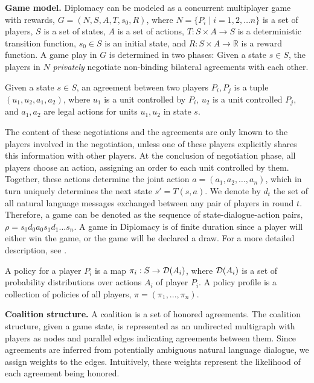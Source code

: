 \textbf{Game model.}  
Diplomacy can be modeled as a concurrent multiplayer game \citep{alur2002alternating} with rewards, $G = (N, S, A, T, s_0, R)$, where $N = \{P_i \mid i = 1, 2, \ldots n\}$ is a set of players, $S$ is a set of states, $A$ is a set of actions, $T: S \times A \rightarrow S$ is a deterministic transition function, $s_0 \in S$ is an initial state, and $R: S \times A \rightarrow \mathbb{R}$ is a reward function. 
A game play in $G$ is determined in two phases: 
Given a state $s \in S$, the players in $N$ \emph{privately} negotiate non-binding bilateral agreements with each other. 
\begin{definition}[Agreement]
	Given a state $s \in S$, an agreement between two players $P_i, P_j$ is a tuple $(u_1, u_2, a_1, a_2)$, where $u_1$ is a unit controlled by $P_i$, $u_2$ is a unit controlled $P_j$, and $a_1, a_2$ are legal actions for units $u_1, u_2$ in state $s$.
\end{definition}

The content of these negotiations and the agreements are only known to the players involved in the negotiation, unless one of these players explicitly shares this information with other players. 
At the conclusion of negotiation phase, all players choose an action, assigning an order to each unit controlled by them. 
Together, these actions determine the joint action $a = (a_1, a_2, \ldots, a_n)$, which in turn uniquely determines the next state $s' = T(s, a)$.
We denote by $d_t$ the set of all natural language messages exchanged between any pair of players in round $t$. 
Therefore, a game can be denoted as the sequence of state-dialogue-action pairs, $\rho = s_0 d_0 a_0 s_1 d_1 \ldots s_n$. 
A game in Diplomacy is of finite duration since a player will either win the game, or the game will be declared a draw.   
For a more detailed description, see \citep{sharp1978game}.


A policy for a player $P_i$ is a map $\pi_i: S \rightarrow \mathcal{D}(A_i)$, where $ \mathcal{D}(A_i)$ is a set of probability distributions over actions $A_i$ of player $P_i$.
A policy profile is a collection of policies of all players, $\pi = (\pi_1,...,\pi_n)$.


\textbf{Coalition structure.} A coalition is a set of honored agreements. 
The coalition structure, given a game state, is represented as an undirected multigraph with players as nodes and parallel edges indicating agreements between them. 
Since agreements are inferred from potentially ambiguous natural language dialogue, we assign weights to the edges.
Intuitively, these weights represent the likelihood of each agreement being honored.

